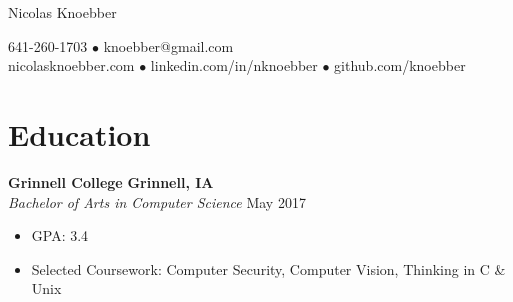 \documentclass[10pt]{article}
\begin{document}
\par{\centering
		{\Huge Nicolas Knoebber
}\bigskip\par}

\begin{center}
641-260-1703 $\bullet$ knoebber@gmail.com\\nicolasknoebber.com $\bullet$ linkedin.com/in/nknoebber $\bullet$ github.com/knoebber
\end{center}

\section{Education}
\textbf{Grinnell College} \hfill \textbf{Grinnell, IA}\\
\textit{Bachelor of Arts in Computer Science} \hfill May 2017
\begin{itemize}[noitemsep,nolistsep]
    \item GPA: 3.4
    \item Selected Coursework: Computer Security, Computer Vision, Thinking in C \& Unix
\end{itemize}
\end{document}
